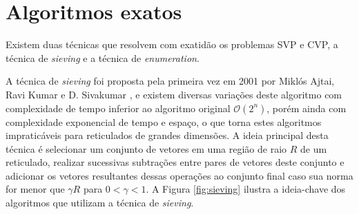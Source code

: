 \section{Algoritmos exatos}
\label{cap:algoritmos_exatos}
    Existem duas técnicas que resolvem com exatidão os problemas SVP e CVP, a técnica de \textit{sieving} e a técnica de \textit{enumeration}. 
    
    A técnica de \textit{sieving} foi proposta pela primeira vez em 2001 por Miklós Ajtai, Ravi Kumar e D. Sivakumar \cite{sieving}, e existem diversas variações deste algoritmo com complexidade de tempo inferior ao algoritmo original $\mathcal{O}(2^n)$, porém ainda com complexidade exponencial de tempo e espaço, o que torna estes algoritmos impraticáveis para reticulados de grandes dimensões. A ideia principal desta técnica é selecionar um conjunto de vetores em uma região de raio $R$ de um reticulado, realizar sucessivas subtrações entre pares de vetores deste conjunto e adicionar os vetores resultantes dessas operações ao conjunto final caso sua norma for menor que $\gamma R$ para $0< \gamma < 1$. A Figura \ref{fig:sieving} ilustra a ideia-chave dos algoritmos que utilizam a técnica de \textit{sieving}. 

